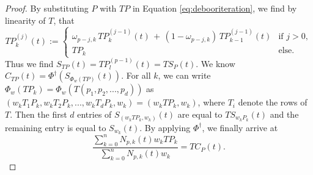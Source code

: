 \begin{proof}
	By substituting $P$ with $TP$ in Equation \ref{eq:debooriteration}, we find by linearity of $T$, that
		\begin{equation*}
			TP^{(j)}_k(t) := \begin{cases}
				\omega_{p-j, k} \, TP^{(j-1)}_k(t) \, + \, (1-\omega_{p-j, k}) \, TP^{(j-1)}_{k-1}(t) 	&\text{if } j > 0,\\
				TP_k 																					&\text{else}.
			\end{cases}
		\end{equation*}
	Thus we find $S_{TP}(t) = TP^{(p-1)}_l(t) = TS_P(t)$. We know $C_{TP}(t) = \Phi^\dagger(S_{\Phi_w(TP)}(t))$. For all $k$, we can write $\Phi_w(TP_k) = \Phi_w(T(p_1, p_2, ..., p_d))$ as $(w_kT_1P_k, w_kT_2P_k, ..., w_kT_dP_k, w_k) = (w_kTP_k, w_k)$, where $T_i$ denote the rows of $T$. Then the first $d$ entries of $S_{(w_kTP_k, w_k)}(t)$ are equal to $TS_{w_kP_k}(t)$ and the remaining entry is equal to $S_{w_k}(t)$. By applying $\Phi^\dagger$, we finally arrive at
	\begin{equation*}
		\frac{\sum_{k=0}^n N_{p,k}(t) w_k TP_k}{\sum_{k=0}^n N_{p,k}(t) w_k} = TC_P(t).
	\end{equation*}
\end{proof}